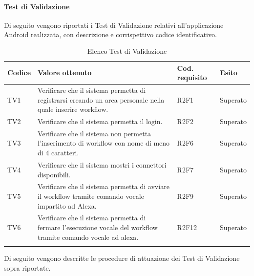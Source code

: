 \paragraph{Test di Validazione}
\label{sec:tvRA}
Di seguito vengono riportati i Test di Validazione relativi all'applicazione Android realizzata, con descrizione e corrispettivo codice identificativo.
\begin{center}
	\centering
	\renewcommand{\arraystretch}{1.5}
	\begin{longtable}{  p{1.2cm}  p{8.5cm} p{2cm} p{1.5cm} }
		\rowcolor{tableHeadYellow}
		\textbf{Codice}   & \textbf{Valore ottenuto} & \textbf{Cod. \mbox{requisito}} & \textbf{Esito} \\ 
		\endhead
		TV1 & Verificare che il sistema permetta di registrarsi creando un area personale nella quale inserire workflow. & R2F1 & Superato \\
		TV2 & Verificare che il sistema permetta il login. & R2F2 & Superato \\
		TV3 & Verificare che il sistema non permetta l’inserimento di workflow con nome di meno di 4 caratteri. & R2F6 & Superato \\
		TV4 & Verificare che il sistema mostri i connettori disponibili. & R2F7 & Superato \\
		TV5 & Verificare che il sistema permetta di avviare il workflow tramite comando vocale impartito ad Alexa. & R2F9 & Superato \\
		TV6 & Verificare che il sistema permetta di fermare l’esecuzione vocale del workflow tramite comando vocale ad alexa. & R2F12 & Superato \\
		\rowcolor{white}
		\caption{Elenco Test di Validazione}
	\end{longtable}
\end{center}
Di seguito vengono descritte le procedure di attuazione dei Test di Validazione sopra riportate.
